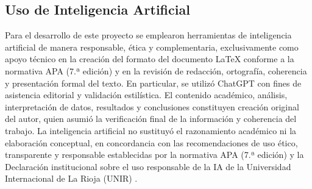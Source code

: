 
\renewcommand\theequation{\Alph{section}\arabic{equation}} %
\renewcommand\thefigure{\Alph{section}\arabic{figure}} %
\renewcommand\thetable{\Alph{section}\arabic{table}} %



\begin{appendices}



\renewcommand{\thesection}{Anexo~\Alph{section}}
\renewcommand{\thesubsection}{\Alph{section}.\arabic{subsection}}

\section{Uso de Inteligencia Artificial}
Para el desarrollo de este proyecto se emplearon herramientas de inteligencia artificial de manera responsable, ética y complementaria, exclusivamente como apoyo técnico en la creación del formato del documento LaTeX conforme a la normativa APA (7.ª edición) y en la revisión de redacción, ortografía, coherencia y presentación formal del texto. En particular, se utilizó ChatGPT \parencite{openai2025chatgpt} con fines de asistencia editorial y validación estilística. El contenido académico, análisis, interpretación de datos, resultados y conclusiones constituyen creación original del autor, quien asumió la verificación final de la información y coherencia del trabajo. La inteligencia artificial no sustituyó el razonamiento académico ni la elaboración conceptual, en concordancia con las recomendaciones de uso ético, transparente y responsable establecidas por la normativa APA (7.ª edición) y la Declaración institucional sobre el uso responsable de la IA de la Universidad Internacional de La Rioja (UNIR) \parencite{unir2025declaracion}.

\end{appendices}
